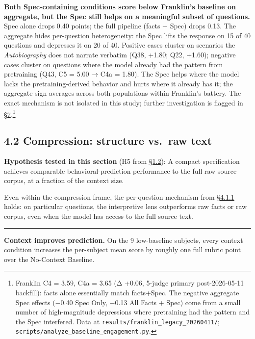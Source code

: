 \textbf{Both Spec-containing conditions score below Franklin's baseline
on aggregate, but the Spec still helps on a meaningful subset of
questions.} Spec alone drops 0.40 points; the full pipeline (facts +
Spec) drops 0.13. The aggregate hides per-question heterogeneity: the
Spec lifts the response on 15 of 40 questions and depresses it on 20 of
40. Positive cases cluster on scenarios the \emph{Autobiography} does
not narrate verbatim (Q38, +1.80; Q22, +1.60); negative cases cluster on
questions where the model already had the pattern from pretraining (Q43,
C5 = 5.00 → C4a = 1.80). The Spec helps where the model lacks the
pretraining-derived behavior and hurts where it already has it; the
aggregate sign averages across both populations within Franklin's
battery. The exact mechanism is not isolated in this study; further
investigation is flagged in \hyperref[future-work]{§7}.\footnote{Franklin C4 = 3.59, C4a
  = 3.65 (Δ +0.06, 5-judge primary post-2026-05-11 backfill): facts
  alone essentially match facts+Spec. The negative aggregate Spec
  effects (−0.40 Spec Only, −0.13 All Facts + Spec) come from a small
  number of high-magnitude depressions where pretraining had the pattern
  and the Spec interfered. Data at
  \texttt{results/franklin\_legacy\_20260411/};
  \texttt{scripts/analyze\_baseline\_engagement.py}.}

\hypertarget{compression-structure-vs.-raw-text}{%
\subsection{4.2 Compression: structure vs.~raw
text}\label{compression-structure-vs.-raw-text}}

\textbf{Hypothesis tested in this section} (H5 from \hyperref[what-we-tested]{§1.2}): A compact
specification achieves comparable behavioral-prediction performance to
the full raw source corpus, at a fraction of the context size.

Even within the compression frame, the per-question mechanism from
\hyperref[per-question-baseline-engagement-and-the-worked-rubric-example]{§4.1.1} holds: on particular questions, the interpretive lens outperforms
raw facts or raw corpus, even when the model has access to the full
source text.

\begin{center}\rule{0.5\linewidth}{0.5pt}\end{center}

\textbf{Context improves prediction.} On the 9 low-baseline subjects,
every context condition increases the per-subject mean score by roughly
one full rubric point over the No-Context Baseline.

